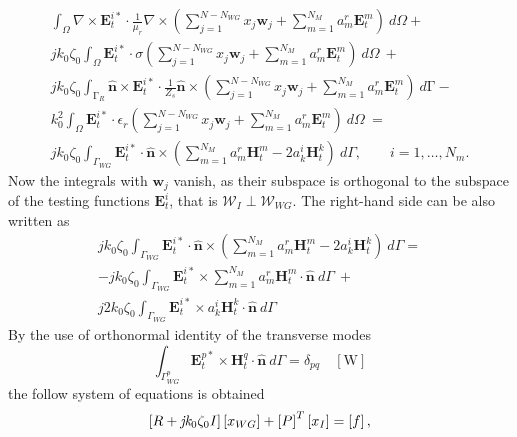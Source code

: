 \begin{multline}
\label{eq:FEMformTFE2}
\int_\Omega \nabla \times \mathbf{E}_t^{i*} \cdot \frac{1}{\mu_r} \nabla \times \left( \sum_{j=1}^{N-N_{WG}} x_j \mathbf{w}_j + \sum_{m=1}^{N_M} a_m^r \mathbf{E}_t^m \right) \ d\Omega +\\
 j k_0 \zeta_0 \int_\Omega \mathbf{E}_t^{i*} \cdot \sigma \left( \sum_{j=1}^{N-N_{WG}} x_j \mathbf{w}_j + \sum_{m=1}^{N_M} a_m^r \mathbf{E}_t^m \right) \ d\Omega \ + \\
 j k_0 \zeta_0 \int_{\mathrm{\Gamma}_R} \hat{\mathbf{n}} \times \mathbf{E}_t^{i*} \cdot \frac{1}{Z_s} \hat{\mathbf{n}} \times \left( \sum_{j=1}^{N-N_{WG}} x_j \mathbf{w}_j + \sum_{m=1}^{N_M} a_m^r \mathbf{E}_t^m \right) \ d\mathrm{\Gamma} - \\
 k_0^2 \int_\Omega \mathbf{E}_t^{i*} \cdot \epsilon_r \left( \sum_{j=1}^{N-N_{WG}} x_j \mathbf{w}_j + \sum_{m=1}^{N_M} a_m^r \mathbf{E}_t^m \right) \ d\Omega \ = \\ 
 j k_0 \zeta_0 \int_{\Gamma_{WG}}  \mathbf{E}_t^{i*} \cdot \hat{\mathbf{n}} \times \left( \sum_{m=1}^{N_M} a_m^r \mathbf{H}_t^m - 2 a_k^i \mathbf{H}_t^k \right) \ d\Gamma, \qquad i = 1, \ldots, N_m.
\end{multline}
\noindent Now the integrals with $\mathbf{w}_j$ vanish,  as their subspace is orthogonal to the subspace of the testing functions $\mathbf{E}_t^i$, that is $\mathcal{W}_I \perp \mathcal{W}_{WG}$. The right-hand side can be also written as
\begin{multline}
 j k_0 \zeta_0 \int_{\Gamma_{WG}}  \mathbf{E}_t^{i*} \cdot \hat{\mathbf{n}} \times \left( \sum_{m=1}^{N_M} a_m^r \mathbf{H}_t^m - 2 a_k^i \mathbf{H}_t^k \right) \ d\Gamma = \\
- j k_0 \zeta_0 \int_{\Gamma_{WG}} \mathbf{E}_t^{i*} \times  \sum_{m=1}^{N_M} a_m^r \mathbf{H}_t^m  \cdot \hat{\mathbf{n}} \ d\Gamma \ + \\
j 2 k_0 \zeta_0 \int_{\Gamma_{WG}} \mathbf{E}_t^{i*}  \times  a_k^i \mathbf{H}_t^k \cdot \hat{\mathbf{n}} \ d\Gamma
\end{multline}
\noindent By the use of orthonormal identity of the transverse modes
\begin{equation}
\int_{\Gamma_{WG}^p} \mathbf{E}_t^{p*}  \times  \mathbf{H}_t^q  \cdot \hat{\mathbf{n}} \ d\Gamma = \delta_{pq} \quad \mathrm{[W]}
\end{equation}
\noindent the follow system of equations is obtained
\begin{equation}
\label{eq:FEInt2}
\left[R + \mathit{jk_\mathrm{0} \zeta_\mathrm{0}} I\right] \left[{{x_{WG}}}\right] + \left[P\right]^T \left[{{x_I}}\right] = \left[{{f}}\right],
\end{equation}
